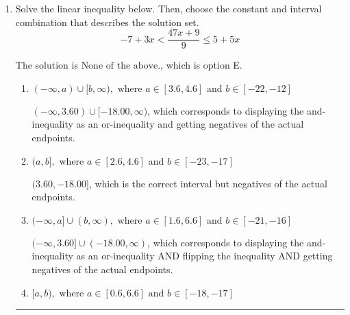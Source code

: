 \documentclass{extbook}[14pt]
\newcommand{\litem}[1]{\item #1

\rule{\textwidth}{0.4pt}}
\begin{document}
\begin{enumerate}
{\begin{enumerate}[label=\Alph*.]
Corresponds to including the endpoints AND negating.
\item \( (-\infty, a] \cup [b, \infty), \text{ where } a \in [-2.5, -0.5] \text{ and } b \in [5, 9] \)

Corresponds to including the endpoints (when they should be excluded).
\item \( (-\infty, a) \cup (b, \infty), \text{ where } a \in [-4.5, -1.5] \text{ and } b \in [4, 13] \)

 * Correct option.
\item \( (-\infty, a) \cup (b, \infty), \text{ where } a \in [-7, -4] \text{ and } b \in [1.5, 5.5] \)

Corresponds to inverting the inequality and negating the solution.
\item \( (-\infty, \infty) \)

Corresponds to the variable canceling, which does not happen in this instance.
\end{enumerate}

\textbf{General Comment:} When multiplying or dividing by a negative, flip the sign.
}
\litem{
Solve the linear inequality below. Then, choose the constant and interval combination that describes the solution set.
\[ -7 + 3 x < \frac{47 x + 9}{9} \leq 5 + 5 x \]

The solution is \( \text{None of the above.} \), which is option E.\begin{enumerate}[label=\Alph*.]
\item \( (-\infty, a) \cup [b, \infty), \text{ where } a \in [3.6, 4.6] \text{ and } b \in [-22, -12] \)

$(-\infty, 3.60) \cup [-18.00, \infty)$, which corresponds to displaying the and-inequality as an or-inequality and getting negatives of the actual endpoints.
\item \( (a, b], \text{ where } a \in [2.6, 4.6] \text{ and } b \in [-23, -17] \)

$(3.60, -18.00]$, which is the correct interval but negatives of the actual endpoints.
\item \( (-\infty, a] \cup (b, \infty), \text{ where } a \in [1.6, 6.6] \text{ and } b \in [-21, -16] \)

$(-\infty, 3.60] \cup (-18.00, \infty)$, which corresponds to displaying the and-inequality as an or-inequality AND flipping the inequality AND getting negatives of the actual endpoints.
\item \( [a, b), \text{ where } a \in [0.6, 6.6] \text{ and } b \in [-18, -17] \)


\end{enumerate}}
\end{enumerate}
\end{document}
